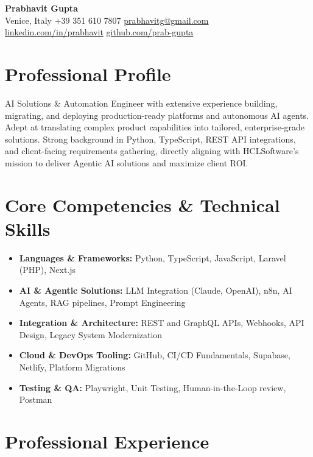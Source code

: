 \documentclass[11pt,a4paper]{article}
\begin{document}
\begin{center}
    {\huge \textbf{Prabhavit Gupta}} \\ \vspace{5pt}
    Venice, Italy \textbar{} +39 351 610 7807 \textbar{} \href{mailto:prabhavitg@gmail.com}{prabhavitg@gmail.com} \\
    \href{https://www.linkedin.com/in/prabhavit}{linkedin.com/in/prabhavit} \textbar{} \href{https://github.com/prab-gupta}{github.com/prab-gupta}
\end{center}

\vspace{10pt}

\section*{Professional Profile}
AI Solutions \& Automation Engineer with extensive experience building, migrating, and deploying production-ready platforms and autonomous AI agents. Adept at translating complex product capabilities into tailored, enterprise-grade solutions. Strong background in Python, TypeScript, REST API integrations, and client-facing requirements gathering, directly aligning with HCLSoftware's mission to deliver Agentic AI solutions and maximize client ROI.

\section*{Core Competencies \& Technical Skills}
\begin{itemize}[leftmargin=*, noitemsep]
    \item \textbf{Languages \& Frameworks:} Python, TypeScript, JavaScript, Laravel (PHP), Next.js
    \item \textbf{AI \& Agentic Solutions:} LLM Integration (Claude, OpenAI), n8n, AI Agents, RAG pipelines, Prompt Engineering
    \item \textbf{Integration \& Architecture:} REST and GraphQL APIs, Webhooks, API Design, Legacy System Modernization
    \item \textbf{Cloud \& DevOps Tooling:} GitHub, CI/CD Fundamentals, Supabase, Netlify, Platform Migrations
    \item \textbf{Testing \& QA:} Playwright, Unit Testing, Human-in-the-Loop review, Postman
\end{itemize}

\section*{Professional Experience}
\end{document}
